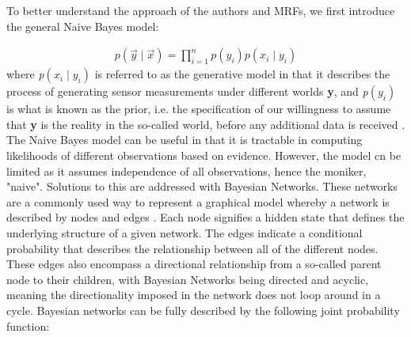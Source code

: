 \documentclass{article}
\begin{document}
To better understand the approach of the authors and MRFs, we first introduce the general Naive Bayes model:

\begin{equation} \label{naiveBayes}
    \begin{aligned}
        \textit{p}\left(\textbf{$\overrightarrow{y}$}\mid\textbf{$\overrightarrow{x}$}\right) = \prod_{i=1}^n \textit{p}\left(\textit{y}_i\right)\textit{p}\left(\textit{x}_i\mid\textit{y}_i\right)
    \end{aligned}
\end{equation} where \textit{p}$\left(\textit{x}_i\mid\textit{y}_i\right)$ is referred to as the generative model in that it describes the process of generating sensor measurements under different worlds \textbf{y}, and \textit{p}$\left(\textit{y}_i\right)$ is what is known as the prior, i.e. the specification of our willingness to assume that \textbf{y} is the reality in the so-called world, before any additional data is received \cite{ST_roboticMappingSurvey}. The Naive Bayes model can be useful in that it is tractable in computing likelihoods of different observations based on evidence. However, the model cn be limited as it assumes independence of all observations, hence the moniker, "naive". Solutions to this are addressed with Bayesian Networks. These networks are a commonly used way to represent a graphical model whereby a network is described by nodes and edges \cite{JSY_understandBeliefPropAndGeneral}. Each node signifies a hidden state that defines the underlying structure of a given network. The edges indicate a conditional probability that describes the relationship between all of the different nodes. These edges also encompass a directional relationship from a so-called parent node to their children, with Bayesian Networks being directed and acyclic, meaning the directionality imposed in the network does not loop around in a cycle. Bayesian networks can be fully described by the following joint probability function: 
\end{document}
